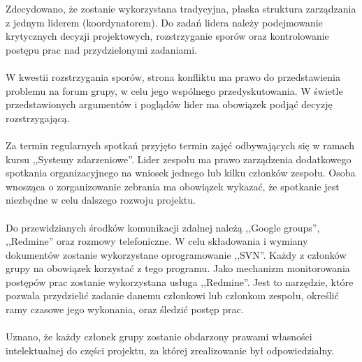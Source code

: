 \noindent Zdecydowano, że zostanie wykorzystana tradycyjna, płaska struktura
zarządzania z jednym liderem (koordynatorem).  Do zadań lidera należy
podejmowanie krytycznych decyzji projektowych, rozstrzyganie sporów
oraz kontrolowanie postępu prac nad przydzielonymi zadaniami.
\\\\
\noindent W kwestii rozstrzygania sporów, strona konfliktu ma prawo do
przedstawienia problemu na forum grupy, w celu jego wspólnego
przedyskutowania.  W świetle przedstawionych argumentów i poglądów
lider ma obowiązek podjąć decyzję rozstrzygającą.
\\\\
\noindent Za termin regularnych spotkań przyjęto termin zajęć odbywających się w
ramach kursu ,,Systemy zdarzeniowe''. Lider zespołu ma prawo
zarządzenia dodatkowego spotkania organizacyjnego na wniosek jednego
lub kilku członków zespołu.  Osoba wnosząca o zorganizowanie zebrania
ma obowiązek wykazać, że spotkanie jest niezbędne w celu dalszego
rozwoju projektu.
\\\\
\noindent Do przewidzianych środków komunikacji zdalnej należą ,,Google
groups'', ,,Redmine'' oraz rozmowy telefoniczne.  W celu składowania i
wymiany dokumentów zostanie wykorzystane oprogramowanie ,,SVN''.
Każdy z członków grupy na obowiązek korzystać z tego programu.  Jako
mechanizm monitorowania postępów prac zostanie wykorzystana usługa
,,Redmine''.  Jest to narzędzie, które pozwala przydzielić zadanie
danemu członkowi lub członkom zespołu, określić ramy czasowe jego
wykonania, oraz śledzić postęp prac.
\\\\
\noindent Uznano, że każdy członek grupy zostanie obdarzony prawami własności
intelektualnej do części projektu, za której zrealizowanie był
odpowiedzialny.
